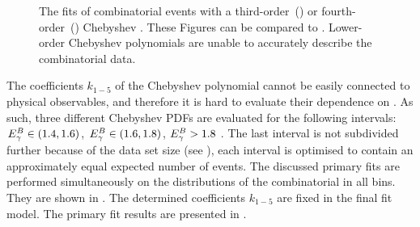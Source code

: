 \begin{figure}[hbtp!]
    \centering
    \caption{\label{fig:lower_order_chebyshev}The \Mbc fits of combinatorial \BB events with a third-order~() or fourth-order~() Chebyshev \PDF.
    These Figures can be compared to .
    Lower-order Chebyshev polynomials are unable to accurately describe the combinatorial \BB data.
    }
\end{figure}


The coefficients $k_{1-5}$ of the Chebyshev polynomial cannot be easily connected to physical observables,
and therefore it is hard to evaluate their dependence on \EB.
As such, three different Chebyshev PDFs are evaluated for the following intervals: ${E^B_{\gamma}}\in(1.4,1.6)$, ${E^B_{\gamma}}\in(1.6,1.8)$, ${E^B_{\gamma}}>1.8$ \gev.
The last interval is not subdivided further because of the data set size (see ), each interval is optimised to contain an approximately equal expected number of events.
The discussed primary fits are performed simultaneously on the \Mbc distributions of the combinatorial \BB in all \EB bins.
They are shown in .
The determined coefficients $k_{1-5}$ are fixed in the final \Mbc fit model.
The primary fit results are presented in .

